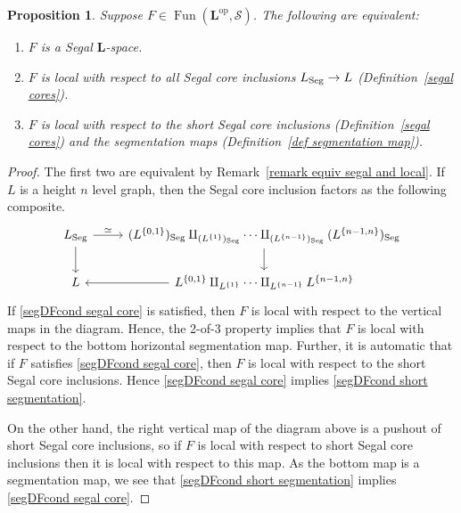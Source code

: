 \documentclass{amsart}
\numberwithin{theorem}{subsection}
\newtheorem{propn}[theorem]{Proposition}
\theoremstyle{definition}
\providecommand{\op}{\mathrm{op}}
\newcommand{\xFun}{\operatorname{Fun}}
\newcommand{\xS}{\mathcal{S}}
\newcommand{\name}[1]{\ensuremath{\text{\textup{#1}}}}
\newcommand{\levelg}{\mathbf{L}}
\newcommand{\Seg}{\name{Seg}}
\begin{document}
\begin{propn}\label{propn:SegDFcond}
Suppose $F \in \xFun(\levelg^{\op},\xS)$.
The following are equivalent:
\begin{enumerate}
\item $F$ is a Segal $\levelg$-space. \label{SegDFcond segal}
\item $F$ is local with respect to all Segal core inclusions $L_{\Seg} \to L$ (Definition~\ref{segal cores}). \label{segDFcond segal core}
\item $F$ is local with respect to the short Segal core inclusions (Definition~\ref{segal cores}) and the segmentation maps (Definition~\ref{def segmentation map}). \label{segDFcond short segmentation}
\end{enumerate}
\end{propn}
\begin{proof}
The first two are equivalent by Remark~\ref{remark equiv segal and local}.
If $L$ is a height $n$ level graph, then the Segal core inclusion factors as the following composite.
\begin{equation*}
\begin{tikzcd}
L_{\Seg} \rar{\simeq} \dar &  (L^{\{0,1\}})_{\Seg} \amalg_{(L^{\{1\}})_{\Seg}} \cdots \amalg_{(L^{\{n-1\}})_{\Seg}} (L^{\{n-1,n\}})_{\Seg} \dar \\
L & L^{\{0,1\}} \amalg_{L^{\{1\}}} \cdots
\amalg_{L^{\{n-1\}}} L^{\{n-1,n\}} \lar 
\end{tikzcd}
\end{equation*}
If \eqref{segDFcond segal core} is satisfied, then $F$ is local with respect to the vertical maps in the diagram. Hence, the 2-of-3 property implies that $F$ is local with respect to the bottom horizontal segmentation map. 
Further, it is automatic that if $F$ satisfies \eqref{segDFcond segal core}, then $F$ is local with respect to the short Segal core inclusions.
Hence \eqref{segDFcond segal core} implies \eqref{segDFcond short segmentation}.

On the other hand, the right vertical map of the diagram above is a pushout of short Segal core inclusions, so if $F$ is local with respect to short Segal core inclusions then it is local with respect to this map.
As the bottom map is a segmentation map, we see that \eqref{segDFcond short segmentation} implies \eqref{segDFcond segal core}.
\end{proof}
\end{document}
